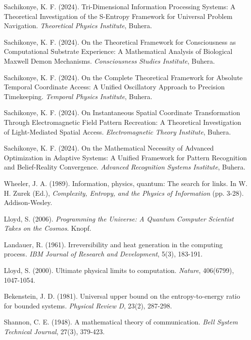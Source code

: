 \documentclass[11pt,a4paper]{article}
\theoremstyle{remark}
\begin{document}
\begin{thebibliography}{99}
Sachikonye, K. F. (2024). Tri-Dimensional Information Processing Systems: A Theoretical Investigation of the S-Entropy Framework for Universal Problem Navigation. \textit{Theoretical Physics Institute}, Buhera.

Sachikonye, K. F. (2024). On the Theoretical Framework for Consciousness as Computational Substrate Experience: A Mathematical Analysis of Biological Maxwell Demon Mechanisms. \textit{Consciousness Studies Institute}, Buhera.

Sachikonye, K. F. (2024). On the Complete Theoretical Framework for Absolute Temporal Coordinate Access: A Unified Oscillatory Approach to Precision Timekeeping. \textit{Temporal Physics Institute}, Buhera.

Sachikonye, K. F. (2024). On Instantaneous Spatial Coordinate Transformation Through Electromagnetic Field Pattern Recreation: A Theoretical Investigation of Light-Mediated Spatial Access. \textit{Electromagnetic Theory Institute}, Buhera.

Sachikonye, K. F. (2024). On the Mathematical Necessity of Advanced Optimization in Adaptive Systems: A Unified Framework for Pattern Recognition and Belief-Reality Convergence. \textit{Advanced Recognition Systems Institute}, Buhera.

Wheeler, J. A. (1989). Information, physics, quantum: The search for links. In W. H. Zurek (Ed.), \textit{Complexity, Entropy, and the Physics of Information} (pp. 3-28). Addison-Wesley.

Lloyd, S. (2006). \textit{Programming the Universe: A Quantum Computer Scientist Takes on the Cosmos}. Knopf.

Landauer, R. (1961). Irreversibility and heat generation in the computing process. \textit{IBM Journal of Research and Development}, 5(3), 183-191.

Lloyd, S. (2000). Ultimate physical limits to computation. \textit{Nature}, 406(6799), 1047-1054.

Bekenstein, J. D. (1981). Universal upper bound on the entropy-to-energy ratio for bounded systems. \textit{Physical Review D}, 23(2), 287-298.

Shannon, C. E. (1948). A mathematical theory of communication. \textit{Bell System Technical Journal}, 27(3), 379-423.


\end{thebibliography}
\end{document}
